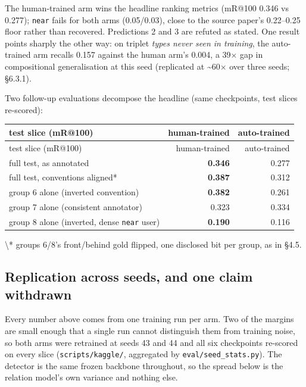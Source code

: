 The human-trained arm wins the headline ranking metrics (mR@100 0.346 vs 0.277); \texttt{near} fails for both arms (0.05/0.03), close to the source paper's 0.22--0.25 floor rather than recovered. Predictions 2 and 3 are refuted as stated. One result points sharply the other way: on triplet \textit{types never seen in training}, the auto-trained arm recalls 0.157 against the human arm's 0.004, a 39$\times$ gap in compositional generalisation at this seed (replicated at \textasciitilde{}60$\times$ over three seeds; \S6.3.1).

Two follow-up evaluations decompose the headline (same checkpoints, test slices re-scored):

\begin{center}
\small
\begin{longtable}{lrr}
\hline
test slice (mR@100) & human-trained & auto-trained \\
\hline
\endfirsthead
\hline
test slice (mR@100) & human-trained & auto-trained \\
\hline
\endhead
full test, as annotated & \textbf{0.346} & 0.277 \\
full test, conventions aligned* & \textbf{0.387} & 0.312 \\
group 6 alone (inverted convention) & \textbf{0.382} & 0.261 \\
group 7 alone (consistent annotator) & 0.323 & 0.334 \\
group 8 alone (inverted, dense \texttt{near} user) & \textbf{0.190} & 0.116 \\
\hline
\end{longtable}
\end{center}

\textbackslash{}* groups 6/8's front/behind gold flipped, one disclosed bit per group, as in \S4.5.

\subsection{Replication across seeds, and one claim withdrawn}

Every number above comes from one training run per arm. Two of the margins are small enough that a single run cannot distinguish them from training noise, so both arms were retrained at seeds 43 and 44 and all six checkpoints re-scored on every slice (\texttt{scripts/kaggle/}, aggregated by \texttt{eval/seed\_stats.py}). The detector is the same frozen backbone throughout, so the spread below is the relation model's own variance and nothing else.

